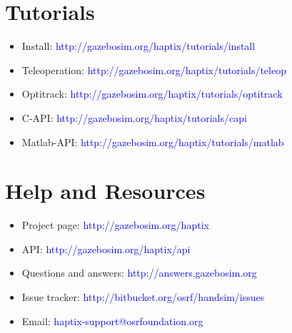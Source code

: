 \documentclass[11pt, letterpaper, landscape]{article}
\begin{document}
\begin{figure}[!htb]
  \centering
  \begin{minipage}[t]{0.48\textwidth}
    \begin{tcolorbox}[height=5cm,colback=gray!8,colframe=gray!15]
      \section*{Tutorials}
      \begin{itemize}
        \item Install: \textcolor{blue}{http://gazebosim.org/haptix/tutorials/install}
        \item Teleoperation: \textcolor{blue}{http://gazebosim.org/haptix/tutorials/teleop}
        \item Optitrack: \textcolor{blue}{http://gazebosim.org/haptix/tutorials/optitrack}
        \item C-API: \textcolor{blue}{http://gazebosim.org/haptix/tutorials/capi}
        \item Matlab-API: \textcolor{blue}{http://gazebosim.org/haptix/tutorials/matlab}
      \end{itemize}
    \end{tcolorbox}
  \end{minipage}%
  \hspace{0.02\textwidth}%
  \begin{minipage}[t]{0.48\textwidth}
    \begin{tcolorbox}[height=5cm,colback=gray!8,colframe=gray!15]
      \section*{Help and Resources}
      \begin{itemize}
        \item Project page: \textcolor{blue}{http://gazebosim.org/haptix}
        \item API: \textcolor{blue}{http://gazebosim.org/haptix/api}
        \item Questions and answers: \textcolor{blue}{http://answers.gazebosim.org}
        \item Issue tracker: \textcolor{blue}{http://bitbucket.org/osrf/handsim/issues}
        \item Email: \textcolor{blue}{haptix-support@osrfoundation.org}
      \end{itemize}

    \end{tcolorbox}
  \end{minipage}
\end{figure}
\end{document}
